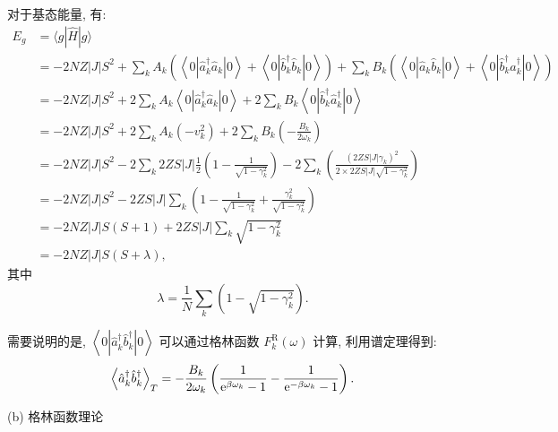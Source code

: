 对于基态能量, 有:
\begin{align}
E_{g} &=\langle g|\hat{H}| g\rangle \nonumber\\
&=-2 N Z|J| S^{2}+\sum_{k} A_{k}\left(\left\langle 0\left|\hat{a}_{k}^{\dagger} \hat{a}^{}_{k}\right| 0\right\rangle+\left\langle 0\left|\hat{b}_{k}^{\dagger} \hat{b}^{}_{k}\right| 0\right\rangle\right)+\sum_{k} B_{k}\left(\left\langle 0\left|\hat{a}^{}_{k} \hat{b}^{}_{k}\right| 0\right\rangle+\left\langle 0 \left|\hat{b}_{k}^{\dagger} \hat{a}_{k}^{\dagger} \right|0\right\rangle\right) \nonumber\\
&=-2 N Z|J| S^{2}+2 \sum_{k} A_{k}\left\langle 0\left|\hat{a}_{k}^{\dagger} \hat{a}^{}_{k}\right| 0\right\rangle+2 \sum_{k} B_{k}\left\langle 0\left|\hat{b}_{k}^{\dagger} \hat{a}_{k}^{\dagger}\right| 0\right\rangle \nonumber\\
&=-2 N Z|J| S^{2}+2 \sum_{k} A_{k}\left(-v_{k}^{2}\right)+2 \sum_{k} B_{k}\left(-\frac{B_{k}}{2 \omega_{k}}\right) \nonumber\\
&=-2 N Z|J| S^{2}-2 \sum_{k} 2 Z S|J| \frac{1}{2}\left(1-\frac{1}{\sqrt{1-\gamma_{k}^{2}}}\right)-2 \sum_{k}\left(\frac{\left(2 Z S|J| \gamma_{k}\right)^{2}}{2 \times 2 Z S|J| \sqrt{1-\gamma_{k}^{2}}}\right)\nonumber \\
&=-2 N Z|J| S^{2}-2 Z S|J| \sum_{k}\left(1-\frac{1}{\sqrt{1-\gamma_{k}^{2}}}+\frac{\gamma_{k}^{2}}{\sqrt{1-\gamma_{k}^{2}}}\right) \nonumber\\
&=-2 N Z|J| S(S+1)+2 Z S|J| \sum_{k} \sqrt{1-\gamma_{k}^{2}}\nonumber \\
&=-2 N Z|J| S(S+\lambda) ,
\end{align}
其中
\begin{equation}
\lambda=\frac{1}{N} \sum_{k}\left(1-\sqrt{1-\gamma_{k}^{2}}\right) .
\end{equation}

需要说明的是, $\left\langle 0\left| \hat{a}_{k}^{\dagger}\hat{b}_{k}^{\dagger}\right| 0\right\rangle$ 可以通过格林函数 $F_{k}^\mathrm{R}(\omega)$ 计算, 利用谱定理得到:
\begin{equation}
\left\langle \hat{a}_{k}^{\dagger}\hat{b}_{k}^{\dagger}\right\rangle_{T}=-\frac{B_{k}}{2 \omega_{k}}\left(\frac{1}{\mathrm{e}^{\beta \omega_{k}}-1}-\frac{1}{\mathrm{e}^{-\beta \omega_{k}}-1}\right) .
\end{equation}

(b) 格林函数理论

